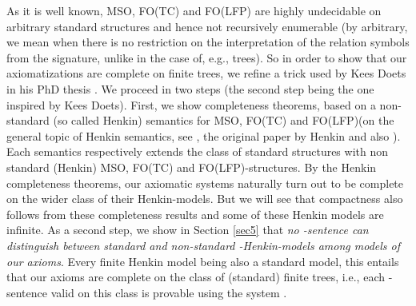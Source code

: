 \documentclass{LMCS}
\newcommand{\mso}{\textsf{MSO}\xspace}
\newcommand{\fotc}{\textsf{FO(TC)}\xspace}
\newcommand{\folfp}{\textsf{FO(LFP)}\xspace}
\begin{document}
As it is well known, \mso, \fotc and \folfp are highly undecidable on arbitrary standard
structures and hence not recursively enumerable (by arbitrary, we mean 
when there is no restriction on the interpretation of the relation
symbols  from the signature, unlike in the case of, e.g., trees). 
So in order to show that our axiomatizations  are complete on finite trees, we refine a trick used by
Kees Doets in his PhD thesis \cite{1987}. We proceed in two steps (the second step being the one inspired by Kees Doets). First, we
show completeness theorems, based on a non-standard (so
called Henkin) semantics for \mso, \fotc and \folfp (on the general topic of Henkin semantics, see \cite{1950}, the original paper by Henkin and also \cite{230876}). Each
semantics respectively extends the class of standard structures with
non standard (Henkin) \mso, \fotc and \folfp-structures. By the
Henkin completeness theorems, our axiomatic systems
 naturally turn out to be complete on the
wider class of their Henkin-models. But we will see that compactness also follows from these completeness results and some of these Henkin
models are infinite. As a second step, we show in Section \ref{sec5} that \emph{no
-sentence can distinguish between standard and non-standard -Henkin-models among models of our axioms}. Every finite Henkin model being also a standard model, this entails that our axioms are complete on the class of (standard) finite trees, i.e., each -sentence valid on this class is provable using the system
. 
\end{document}
